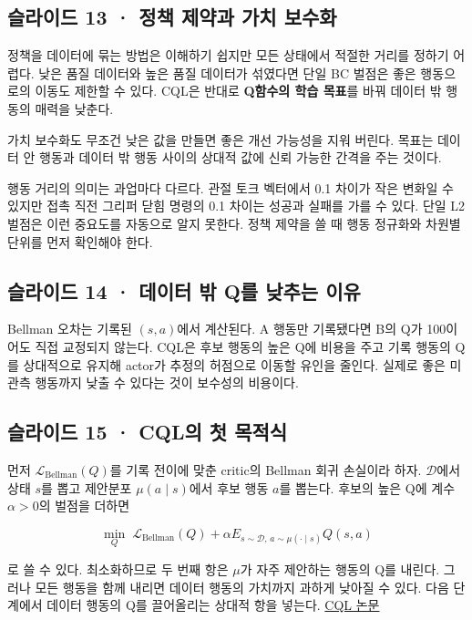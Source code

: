 \documentclass[11pt,a4paper]{article}
\begin{document}
\subsection{슬라이드 13 · 정책 제약과 가치 보수화}

정책을 데이터에 묶는 방법은 이해하기 쉽지만 모든 상태에서 적절한 거리를 정하기 어렵다. 낮은 품질 데이터와 높은 품질 데이터가 섞였다면 단일 BC 벌점은 좋은 행동으로의 이동도 제한할 수 있다. CQL은 반대로 \textbf{Q함수의 학습 목표}를 바꿔 데이터 밖 행동의 매력을 낮춘다.\par

가치 보수화도 무조건 낮은 값을 만들면 좋은 개선 가능성을 지워 버린다. 목표는 데이터 안 행동과 데이터 밖 행동 사이의 상대적 값에 신뢰 가능한 간격을 주는 것이다.\par

행동 거리의 의미는 과업마다 다르다. 관절 토크 벡터에서 0.1 차이가 작은 변화일 수 있지만 접촉 직전 그리퍼 닫힘 명령의 0.1 차이는 성공과 실패를 가를 수 있다. 단일 L2 벌점은 이런 중요도를 자동으로 알지 못한다. 정책 제약을 쓸 때 행동 정규화와 차원별 단위를 먼저 확인해야 한다.\par

\subsection{슬라이드 14 · 데이터 밖 Q를 낮추는 이유}

Bellman 오차는 기록된 $(s,a)$에서 계산된다. A 행동만 기록됐다면 B의 Q가 100이어도 직접 교정되지 않는다. CQL은 후보 행동의 높은 Q에 비용을 주고 기록 행동의 Q를 상대적으로 유지해 actor가 추정의 허점으로 이동할 유인을 줄인다. 실제로 좋은 미관측 행동까지 낮출 수 있다는 것이 보수성의 비용이다.\par

\subsection{슬라이드 15 · CQL의 첫 목적식}

먼저 $\mathcal L_{\mathrm{Bellman}}(Q)$를 기록 전이에 맞춘 critic의 Bellman 회귀 손실이라 하자. $\mathcal D$에서 상태 $s$를 뽑고 제안분포 $\mu(a\mid s)$에서 후보 행동 $a$를 뽑는다. 후보의 높은 Q에 계수 $\alpha>0$의 벌점을 더하면\par

\[
\min_Q\;\mathcal L_{\mathrm{Bellman}}(Q)
+\alpha E_{s\sim\mathcal D,\,a\sim\mu(\cdot\mid s)}Q(s,a)
\]

로 쓸 수 있다. 최소화하므로 두 번째 항은 $\mu$가 자주 제안하는 행동의 Q를 내린다. 그러나 모든 행동을 함께 내리면 데이터 행동의 가치까지 과하게 낮아질 수 있다. 다음 단계에서 데이터 행동의 Q를 끌어올리는 상대적 항을 넣는다. \href{https://arxiv.org/abs/2006.04779}{CQL 논문}\par
\end{document}
